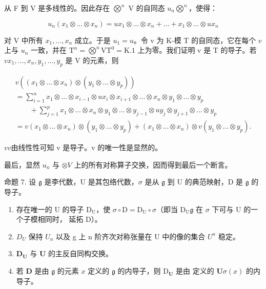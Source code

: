 从 F 到  V 是多线性的。因此存在 \(\bigotimes^{n}\) V 的自同态 \(u_{n}\)\(\bigotimes^{n}\)，使得：

\[
u _ {n} \left(x _ {1} \otimes \dots \otimes x _ {n}\right) = u x _ {1} \otimes \dots \otimes x _ {n} + \dots + x _ {1} \otimes \dots \otimes u x _ {n}
\]

对 V 中所有 \(x_1, \ldots, x_n\) 成立。于是 \(u_1 = u\)。令 v 为 K-模 T 的自同态，它在每个 \(v\) 上与 \(u_n\) 一致，并在 \(\mathrm{T}^n = \bigotimes^n \mathrm{V}\)\(\mathrm{T}^0 = \mathrm{K}. 1\) 上为零。我们证明 v 是 T 的导子。若 \(v\)\(x_1, \ldots, x_n, y_1, \ldots, y_p\) 是 V 的元素，则

\[
\begin{array}{l} v ((x _ {1} \otimes \dots \otimes x _ {n}) \otimes (y _ {1} \otimes \dots \otimes y _ {p})) \\ = \sum_ {i = 1} ^ {n} x _ {1} \otimes \dots \otimes x _ {i - 1} \otimes u x _ {i} \otimes x _ {i + 1} \otimes \dots \otimes x _ {n} \otimes y _ {1} \otimes \dots \otimes y _ {p} \\ \qquad + \sum_ {j = 1} ^ {p} x _ {1} \otimes \dots \otimes x _ {n} \otimes y _ {1} \otimes \dots \otimes y _ {j - 1} \otimes u y _ {j} \otimes y _ {j + 1} \otimes \dots \otimes y _ {p} \\ = v (x _ {1} \otimes \dots \otimes x _ {n}) \otimes (y _ {1} \otimes \dots \otimes y _ {p}) + (x _ {1} \otimes \dots \otimes x _ {n}) \otimes v (y _ {1} \otimes \dots \otimes y _ {p}). \end{array}
\]

\(v\)\(v\)由线性性可知 v 是导子。v 的唯一性是显然的。

最后，显然 \(u_{n}\) 与 \(\otimes V\) 上的所有对称算子交换，因而得到最后一个断言。

命题 7. 设 \(\mathfrak{g}\) 是李代数，U 是其包络代数，\(\sigma\) 是从 \(\mathfrak{g}\) 到 U 的典范映射，D 是 \(\mathfrak{g}\) 的导子。

\begin{enumerate}
\def\labelenumi{(\alph{enumi})}
\item
  存在唯一的 U 的导子 \(\mathrm{D_U}\)，使 \(\sigma \circ \mathrm{D} = \mathrm{D_U} \circ \sigma\)（即当 \(\mathrm{D_U}\)\(\mathfrak{g}\) 在 \(\sigma\) 下可与 U 的一个子模相同时， 延拓 D）。
\item
  \(D_{U}\) 保持 \(U_{n}\) 以及 g 上 n 阶齐次对称张量在 U 中的像的集合 \(U^{n}\) 稳定。
\item
  \(\mathbf{D}_{\mathbf{U}}\) 与 \(\mathbf{U}\) 的主反自同构交换。
\item
  若 \(\mathbf{D}\) 是由 \(\mathfrak{g}\) 的元素 \(x\) 定义的 \(\mathfrak{g}\) 的内导子，则 \(\mathrm{D}_{\mathbf{U}}\) 是由  定义的 \(\mathbf{U}\)\(\sigma(x)\) 的内导子。
\end{enumerate}

